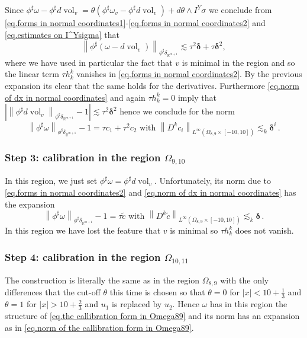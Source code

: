 \documentclass[reqno]{amsart}
\theoremstyle{definition}
\theoremstyle{remark}
\numberwithin{equation}{section}
\newcommand{\norm}[1]{\left\lVert#1\right\rVert}
\newcommand{\R}{\mathbb{R}}
\begin{document}
Since $\phi^\sharp\omega - \phi^\sharp d\operatorname{vol}_v = \theta (\phi^\sharp\omega_v- \phi^\sharp d\operatorname{vol}_v) + d\theta \wedge I^Y\sigma$ we conclude from \eqref{eq.forms in normal coordinates1}-\eqref{eq.forms in normal coordinates2} and \eqref{eq.estimates on I^Ysigma} that 
\[ \norm{\phi^\sharp(\omega -d\operatorname{vol}_v)}_{\phi^\sharp \delta_{\R^{m+1}}}\lesssim \tau^2 \boldsymbol{\delta}+ \tau \boldsymbol{\delta}^2,\]
where we have used in particular the fact that $v$ is minimal in the region and so the linear term $\tau h^k_k$ vanishes in \eqref{eq.forms in normal coordinates2}. By the previous expansion its clear that the same holds for the derivatives.  
Furthermore \eqref{eq.norm of dx in normal coordinates} and again $\tau h_k^k =0$ imply that $\left|\norm{\phi^\sharp d\operatorname{vol}_v}_{\phi^\sharp \delta_{\R^{m+1}}}- 1 \right|\lesssim  \tau^2 \boldsymbol{\delta}^2$ hence we conclude for the norm
\begin{equation}\label{eq.norm of the callibration form in Omega89}
    \norm{\phi^\sharp \omega}_{\phi^\sharp \delta_{\R^{m+1}}}- 1 = \tau c_1 + \tau^2c_2 \text{ with } \norm{D^kc_i}_{L^\infty(\Omega_{8,9}\times[-10,10])} \lesssim_k \boldsymbol{\delta}^i\,.
\end{equation}

\subsubsection*{Step 3: calibration in the region $\Omega_{9,10}$}
In this region, we just set $\phi^\sharp\omega = \phi^\sharp d\operatorname{vol}_v$. Unfortunately, its norm due to \eqref{eq.forms in normal coordinates2} and \eqref{eq.norm of dx in normal coordinates} has the expansion 
\[ \norm{\phi^\sharp \omega}_{\phi^\sharp \delta_{\R^{m+1}}}- 1 = \tau \tilde{c} \text{ with } \norm{D^k\tilde{c}}_{L^\infty(\Omega_{8,9}\times[-10,10])} \lesssim_k \boldsymbol{\delta}\,.\]
In this region we have lost the feature that $v$ is minimal so $\tau h^k_k$ does not vanish. 

\subsubsection*{Step 4: calibration in the region $\Omega_{10,11}$}
The construction is literally the same as in the region $\Omega_{8,9}$ with the only differences that the cut-off $\theta$ this time is chosen so that  
$\theta=0$ for $|x|<10+\frac13$ and $\theta=1$ for $|x|> 10 +\frac23$ and $u_1$ is replaced by $u_2$. 
Hence $\omega$ has in this region the structure of \eqref{eq.the callibration form in Omega89} and its norm has an expansion as in \eqref{eq.norm of the callibration form in Omega89}.
\end{document}
